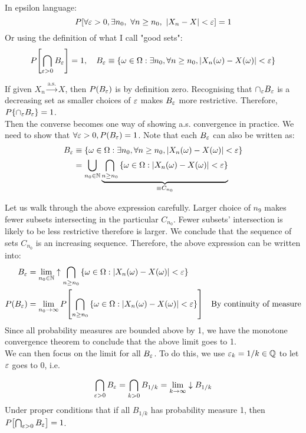\noindent In epsilon language: 
$$P\qty[\forall {\varepsilon}>0, \exists n_0, \ \forall n\geq n_0, \ \abs{X_n - X}<{\varepsilon}] = 1$$
Or using the definition of what I call "good sets": 
$$P\qty[\bigcap_{{\varepsilon}>0}B_{\varepsilon}] = 1, \quad B_{\varepsilon}\equiv \qty{\omega\in \Omega: \exists n_0, \forall n\geq n_0, \abs{X_n(\omega) - X(\omega)}<{\varepsilon}}$$

\noindent If given $X_n \xrightarrow{\text{a.s.}} X$, then $P(B_{\varepsilon})$ is by definition zero. Recognising that $\cap_{{\varepsilon}} B_{\varepsilon}$ is a decreasing set as smaller choices of ${\varepsilon}$ makes $B_{\varepsilon}$ more restrictive. Therefore, $P\qty{\cap_{\varepsilon}B_{\varepsilon}} = 1$. \\

\noindent Then the converse becomes one way of showing a.s. convergence in practice. We need to show that $\forall {\varepsilon}>0, P(B_{\varepsilon}) = 1$. Note that each $B_{{\varepsilon}}$ can also be written as: 
\begin{align*}
	B_{{\varepsilon}} &\equiv \qty{\omega\in \Omega : \exists n_0, \forall n\geq n_0, \abs{X_n(\omega) - X(\omega)}<{\varepsilon}}\\
	&= \bigcup_{n_0\in \mathbb{N}} \underbrace{\bigcap_{n\geq n_0}\qty{\omega\in \Omega : \abs{X_n(\omega) - X(\omega)}<{\varepsilon}}}_{\equiv C_{n_0}}
\end{align*}

\noindent Let us walk through the above expression carefully. Larger choice of $n_9$ makes fewer subsets intersecting in the particular $C_{n_0}$. Fewer subsets' intersection is likely to be less restrictive therefore is larger. We conclude that the sequence of sets $C_{n_0}$ is an increasing sequence. Therefore, the above expression can be written into: 
\begin{align*}
	B_{{\varepsilon}} &= \lim_{n_0\in \mathbb{N}}\uparrow \bigcap_{n\geq n_0}\qty{\omega\in \Omega : \abs{X_n(\omega) - X(\omega)}<{\varepsilon}} \\
	P(B_{{\varepsilon}}) &= \lim_{n_0 \to \infty}P\qty[\bigcap_{n\geq n_0}\qty{\omega\in \Omega : \abs{X_n(\omega) - X(\omega)}<{\varepsilon}}]\quad \text{By continuity of measure}
\end{align*}
Since all probability measures are bounded above by 1, we have the monotone convergence theorem to conclude that the above limit goes to 1.\\

\noindent We can then focus on the limit for all $B_{\varepsilon}$. To do this, we use ${\varepsilon}_k = 1/k\in \mathbb{Q}$ to let ${\varepsilon}$ goes to 0, i.e.

$$\bigcap_{{\varepsilon}>0}B_{\varepsilon} = \bigcap_{k>0}B_{1/k} = \lim_{k\to\infty} \downarrow B_{1/k}$$
Under proper conditions that if all $B_{1/k}$ has probability measure 1, then $P\qty[\bigcap_{{\varepsilon}>0}B_{\varepsilon}] = 1$. 


